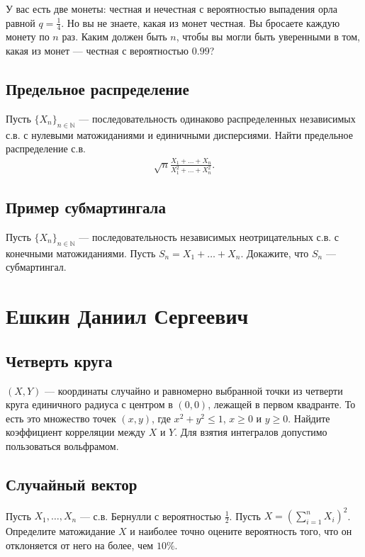 \documentclass[12pt]{article}
\newcommand\N{\mathbb{N}}
\begin{document}
У вас есть две монеты: честная и нечестная с вероятностью выпадения орла равной $q = \frac{1}{4}$. Но вы не знаете, какая из монет честная. Вы бросаете каждую монету по $n$ раз. Каким должен быть $n$, чтобы вы могли быть уверенными в том, какая из монет --- честная с вероятностью $0.99$? 


\subsection{Предельное распределение}

Пусть $\{X_n\}_{n \in \N}$ --- последовательность одинаково распределенных независимых с.в. с нулевыми матожиданиями и единичными дисперсиями. Найти предельное распределение с.в.
\begin{align*}
    \sqrt{n}\frac{X_1 + \dots + X_n}{X_1^2 + \dots + X_n^2}.
\end{align*}

\subsection{Пример субмартингала}

Пусть $\{X_n\}_{n \in \N}$ --- последовательность независимых неотрицательных с.в. с конечными матожиданиями. Пусть $S_n = X_1 + \dots + X_n$. Докажите, что $S_n$ --- субмартингал.

\newpage
\section{Ешкин Даниил Сергеевич}

\subsection{Четверть круга}

$(X, Y)$ --- координаты случайно и равномерно выбранной точки из четверти круга единичного радиуса с центром в $(0, 0)$, лежащей в первом квадранте. То есть это множество точек $(x, y)$, где $x^2 + y^2 \le 1$, $x \ge 0$ и $y \ge 0$. Найдите коэффициент корреляции между $X$ и $Y$. Для взятия интегралов  допустимо пользоваться вольфрамом.


\subsection{Случайный вектор}

Пусть $X_1, \dots, X_n$ --- с.в. Бернулли с вероятностью $\frac{1}{2}$. Пусть $X = (\sum_{i = 1}^n X_i)^2$. Определите матожидание $X$ и наиболее точно оцените вероятность того, что он отклоняется от него на более, чем $10\%$.
\end{document}
